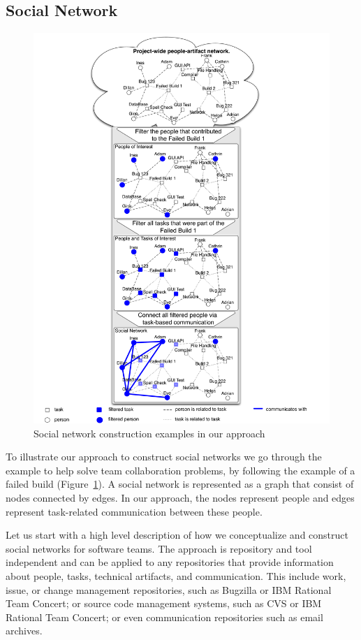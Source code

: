 \subsection{Social Network}
\begin{figure}[t!]
\begin{center}
\includegraphics[height=1.3\textwidth]{./figures/grand_figure}
\caption{Social network construction examples in our approach}
\label{fig:network}
\end{center}
\end{figure}
To illustrate our approach to construct social networks we go through the example to help solve team collaboration problems, by following the example of a failed build (Figure~\ref{fig:network}). 
A social network is represented as a graph that consist of nodes connected by edges. 
In our approach, the nodes represent people and edges represent task-related communication between these people.

Let us start with a high level description of how we conceptualize and construct social networks for software teams. 
The approach is repository and tool independent and can be applied to any repositories that provide information about people, tasks, technical artifacts, and communication. 
This include work, issue, or change management repositories, such as Bugzilla or IBM Rational Team Concert; or source code management systems, such as CVS or IBM Rational Team Concert; or even communication repositories such as email archives.

